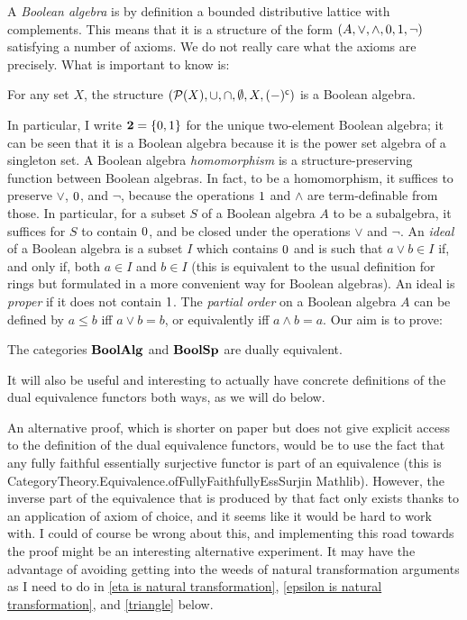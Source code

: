 A \emph{Boolean algebra} is by definition a bounded distributive lattice with
complements. This means that it is a structure of the form $(A, \vee, \wedge,
0, 1, \neg)$ satisfying a number of axioms. We do not really care what
the axioms are precisely. What is important to know is: 
\begin{lemma}\leanok
    For any set $X$, the structure 
    $(\mathcal{P}(X), \cup, \cap, \emptyset, X, (-)^{\mathsf{c}})$ 
    is a Boolean algebra.
\end{lemma}
In particular, I write $\mathbf{2} = \{ 0, 1 \}$ for the unique two-element
Boolean algebra; it can be seen that it is a Boolean algebra because it is the
power set algebra of a singleton set. A Boolean algebra \emph{homomorphism} is
a structure-preserving function between Boolean algebras. In fact, to be a
homomorphism, it suffices to preserve $\vee$, $0$, and $\neg$, because the
operations $1$ and $\wedge$ are term-definable from those. In particular,
for a subset $S$ of a Boolean algebra $A$ to be a subalgebra, it suffices for
$S$ to contain $0$, and be closed under the operations $\vee$ and $\neg$. An
\emph{ideal} of a Boolean algebra is a subset $I$ which contains $0$ and is
such that $a \vee b \in I$ if, and only if, both $a \in I$ and $b \in I$ (this
is equivalent to the usual definition for rings but formulated in a more
convenient way for Boolean algebras). An ideal is \emph{proper} if it does not
contain $1$. The \emph{partial order} on a Boolean algebra $A$ can be
defined by $a \leq b$ iff $a \vee b = b$, or equivalently  iff $a \wedge b =
a$. Our aim is to prove:
\begin{theorem}
    \label{BABoolSpdualeq} 
    The categories $\mathbf{BoolAlg}$ and $\mathbf{BoolSp}$ are dually equivalent.
\end{theorem}
It will also be useful and interesting to actually have concrete definitions of
the dual equivalence functors both ways, as we will do below. 
\begin{remark}
An alternative proof, which is shorter on paper but does not give explicit
access to the definition of the dual equivalence functors, would be to use the
fact that any fully faithful essentially surjective functor is part of an
equivalence (this is 
{CategoryTheory.Equivalence.ofFullyFaithfullyEssSurj}{in Mathlib}). However,
the inverse part of the equivalence that is produced by that fact only exists
thanks to an application of axiom of choice, and it seems like it would be hard
to work with. I could of course be wrong about this, and implementing this road
towards the proof might be an interesting alternative experiment. It may have
the advantage of avoiding getting into the weeds of natural transformation
arguments as I need to do in \cref{eta is natural transformation}, \cref{epsilon is natural transformation}, and \cref{triangle} below.
\end{remark}

